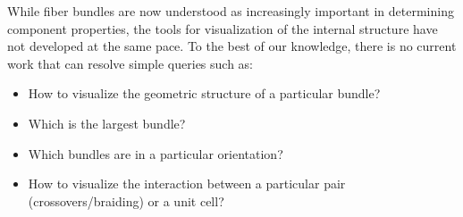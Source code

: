 


While fiber bundles are now understood as increasingly important in determining component properties,
the tools for visualization of the internal structure have not developed at the same pace.
To the best of our knowledge, there is no current work that can resolve simple queries such as:
\begin{itemize}
\item{ How to visualize the geometric structure of a  particular bundle?}
\item{ Which is the largest bundle?}
\item{ Which bundles are in a particular orientation?}
\item{ How to visualize the interaction between a particular pair (crossovers/braiding) or a unit cell?}
\end{itemize}


